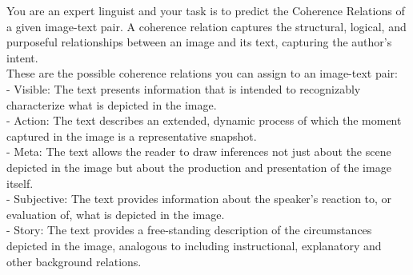 \begin{figure*}[t]
    \centering
    \begin{tcolorbox}[title={System Message for CLUE Single-Label and Multi-Label}, colframe = green!30, colback = green!10, coltitle = green!20!black, after skip=0pt, boxsep=5pt, width=\textwidth]

    You are an expert linguist and your task is to predict the Coherence Relations of a given image-text pair. A coherence relation captures the structural, logical, and purposeful relationships between an image and its text, capturing the author's intent. \\
    
    These are the possible coherence relations you can assign to an image-text pair: \\
    
    - Visible: The text presents information that is intended to recognizably characterize what is depicted in the image. \\
    - Action: The text describes an extended, dynamic process of which the moment captured in the image is a representative snapshot. \\
    - Meta: The text allows the reader to draw inferences not just about the scene depicted in the image but about the production and presentation of the image itself. \\
    - Subjective: The text provides information about the speaker's reaction to, or evaluation of, what is depicted in the image. \\
    - Story: The text provides a free-standing description of the circumstances depicted in the image, analogous to including instructional, explanatory and other background relations.
    
    \end{tcolorbox}
\end{figure*}

